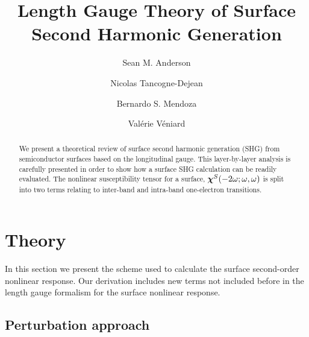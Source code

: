 \documentclass[floatfix,prb,aps,superscriptaddress,11pt,preprint,letterpaper]{revtex4}
\begin{document}
\title{Length Gauge Theory of Surface Second Harmonic Generation}
\author{Sean M. Anderson}
\author{Nicolas Tancogne-Dejean}
\author{Bernardo S. Mendoza}
\author{Val\'erie V\'eniard}

\begin{abstract}
We present a theoretical review of surface second harmonic generation (SHG) 
from semiconductor surfaces based on the longitudinal gauge. This 
layer-by-layer analysis is carefully presented in order to show how a 
surface SHG calculation can be readily evaluated. The nonlinear susceptibility 
tensor for a surface, $\boldsymbol{\chi}^S(-2\omega;\omega,\omega)$
 is split into two terms relating to inter-band 
and intra-band one-electron transitions. 

\end{abstract}  

\maketitle

\section{Theory}

\label{theory}

In this section we present the scheme used to calculate the surface second-order
nonlinear response.
Our derivation includes new terms not included
before in the length gauge formalism for the surface nonlinear
response. 

\subsection{Perturbation approach}
\end{document}
